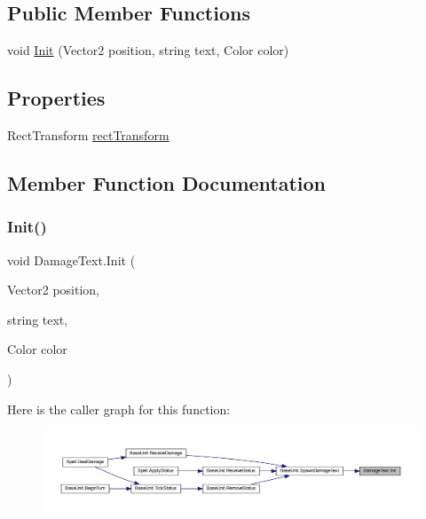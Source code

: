 \subsection*{Public Member Functions}
\begin{DoxyCompactItemize}
\item 
void \mbox{\hyperlink{class_damage_text_ab66ed998f41cdeb84c22449950170f67}{Init}} (Vector2 position, string text, Color color)
\end{DoxyCompactItemize}
\subsection*{Properties}
\begin{DoxyCompactItemize}
\item 
Rect\+Transform \mbox{\hyperlink{class_damage_text_ae6860819b6715004f9f05314039aa978}{rect\+Transform}}
\end{DoxyCompactItemize}


\subsection{Member Function Documentation}
\mbox{\label{class_damage_text_ab66ed998f41cdeb84c22449950170f67}} 
\subsubsection{\texorpdfstring{Init()}{Init()}}
{\footnotesize\ttfamily void Damage\+Text.\+Init (\begin{DoxyParamCaption}\item[{Vector2}]{position,  }\item[{string}]{text,  }\item[{Color}]{color }\end{DoxyParamCaption})}

Here is the caller graph for this function\+:
\nopagebreak
\begin{figure}[H]
\begin{center}
\leavevmode
\includegraphics[width=350pt]{class_damage_text_ab66ed998f41cdeb84c22449950170f67_icgraph}
\end{center}
\end{figure}


